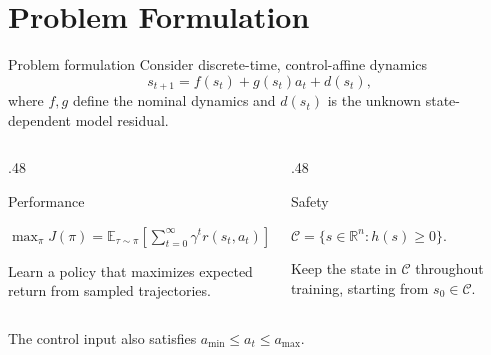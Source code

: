 \documentclass[aspectratio=169,10pt]{beamer}
\newcommand{\R}{\mathbb R}
\newcommand{\Cset}{\mathcal C}
\begin{document}
\section{Problem Formulation}
\begin{frame}{Problem formulation}
Consider discrete-time, control-affine dynamics
\begin{equation}
s_{t+1}=f(s_t)+g(s_t)a_t+d(s_t),
\end{equation}
where $f,g$ define the nominal dynamics and $d(s_t)$ is the unknown state-dependent model residual.
\vspace{.5em}
\begin{columns}[T,onlytextwidth]
\begin{column}{.48\textwidth}
\begin{block}{Performance}
\begin{minipage}[t][2.15cm][t]{\linewidth}
\begin{minipage}[c][1.15cm][c]{\linewidth}
\centering
$\displaystyle\max_\pi J(\pi)=\mathbb E_{\tau\sim\pi}\!\left[\sum_{t=0}^{\infty}\gamma^t r(s_t,a_t)\right].$
\end{minipage}\par
Learn a policy that maximizes expected return from sampled trajectories.
\end{minipage}
\end{block}
\end{column}
\begin{column}{.48\textwidth}
\begin{block}{Safety}
\begin{minipage}[t][2.15cm][t]{\linewidth}
\begin{minipage}[c][1.15cm][c]{\linewidth}
\centering
$\displaystyle\Cset=\{s\in\R^n:h(s)\ge0\}.$
\end{minipage}\par
Keep the state in $\Cset$ throughout training, starting from $s_0\in\Cset$.
\end{minipage}
\end{block}
\end{column}
\end{columns}
\vspace{.5em}
The control input also satisfies $a_{\min}\le a_t\le a_{\max}$.
\end{frame}
\end{document}
